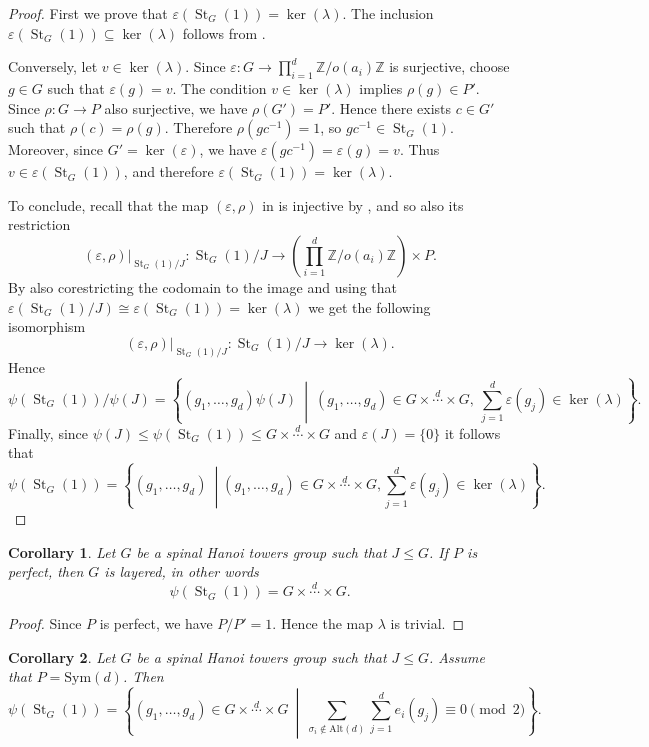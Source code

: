 \documentclass[11pt,leqno]{amsart}
\theoremstyle{plain}
\newtheorem{corollary}[corollary]{Corollary}
\DeclareMathOperator{\St}{St}
\newcommand{\alt}{\mathrm{Alt}}
\newcommand{\Sym}{\mathrm{Sym}}
\newcommand{\ml}[1]{\textcolor{magenta}{#1}}
\numberwithin{equation}{section}
\begin{document}
\begin{proof}
First we prove that $\varepsilon(\St_G(1))=\ker(\lambda)$.
The inclusion $\varepsilon(\St_G(1))\subseteq \ker(\lambda)$ follows from .


Conversely, let $v\in\ker(\lambda)$. Since $\varepsilon:G\to \prod_{i=1}^d \mathbb Z/o(a_i)\mathbb Z$
is surjective, choose $g\in G$ such that $\varepsilon(g)=v$. The condition $v\in\ker(\lambda)$ implies $\rho(g)\in P'$. Since $\rho:G\to P$ also surjective, we have $\rho(G')=P'$. Hence there exists $c\in G'$ such that $\rho(c)=\rho(g)$. Therefore $\rho(gc^{-1})=1$, so $gc^{-1}\in \St_G(1)$. Moreover, since $G'=\ker(\varepsilon)$, we have $\varepsilon(gc^{-1})=\varepsilon(g)=v$.
Thus $v\in \varepsilon(\St_G(1))$, and therefore $\varepsilon(\St_G(1))=\ker(\lambda)$. 

To conclude, recall that the map $(\varepsilon,\rho)$ in  is injective by , and so also its restriction
\[
(\varepsilon,\rho)|_{\St_G(1)/J}:\St_G(1)/J\longrightarrow \left(\prod_{i=1}^d\mathbb Z/o(a_i)\mathbb Z \right)\times P.
\]
By also corestricting the codomain to the image and using that $\varepsilon(\St_G(1)/J)\cong\varepsilon(\St_G(1))=\ker(\lambda)$  we get the following isomorphism
\[
(\varepsilon,\rho)|_{\St_G(1)/J}:\St_G(1)/J\longrightarrow \ker(\lambda).
\]
Hence
\[
\psi(\St_G(1))/\psi(J)
=
\left\{
(g_1,\ldots,g_d)\psi(J)
\ \middle|\
(g_1,\ldots,g_d)\in G\times \stackrel{d}{\cdots}\times G,\ 
\sum_{j=1}^d \varepsilon(g_j)\in \ker(\lambda)
\right\}.
\]
Finally, since $\psi(J)\leq\psi(\St_G(1))\leq G\times \stackrel{d}{\cdots}\times G$ and $\varepsilon(J)=\{0\}$ it follows that
\[
\psi(\St_G(1))
=
\left\{
(g_1,\ldots,g_d) \ \middle| (g_1,\ldots,g_d)\in G\times \stackrel{d}{\cdots}\times G,\sum_{j=1}^d \varepsilon(g_j)\in \ker(\lambda)
\right\}.
\]

\end{proof}
\begin{corollary}\label{perfectcase}
	Let $G$ be a spinal Hanoi towers group such that $J\leq G$. If $P$ is perfect, then $G$ is layered, in other words
	\[
	\psi(\St_G(1))=G\times \stackrel{d}{\cdots}\times G.
	\]
\end{corollary}

\begin{proof}
	Since $P$ is perfect, we have $P/P'=1$. Hence the map $\lambda$ is trivial.
\end{proof}

\begin{corollary}\ml{\label{cor:symcase}}
	Let $G$ be a spinal Hanoi towers group such that $J\leq G$. Assume that $P=\Sym(d)$. Then
	\[
	\psi(\St_G(1))
	=
	\left\{
	(g_1,\ldots,g_d)\in G\times \stackrel{d}{\cdots}\times G
	\ \middle|\
	\sum_{\sigma_i\notin \alt(d)}\sum_{j=1}^d e_i(g_j)\equiv 0 \pmod 2
	\right\}.
	\]
\end{corollary}
\end{document}
